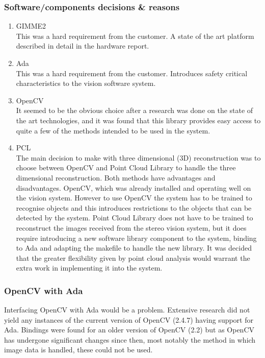 \subsubsection{Software/components decisions \& reasons}
\begin{enumerate}
  \item GIMME2 \\ This was a hard requirement from the customer. A state of the art platform described in detail in the hardware report.
  \item Ada \\ This was a hard requirement from the customer. Introduces safety critical characteristics to the vision software system.
  \item OpenCV \\ It seemed to be the obvious choice after a research was done on the state of the art technologies, and it was found that this library provides easy access to quite a few of the methods intended to be used in the system.
  \item PCL \\ The main decision to make with three dimensional (3D) reconstruction was to choose between OpenCV and Point Cloud Library to handle the three dimensional reconstruction. Both methods have advantages and disadvantages. OpenCV, which was already installed and operating well on the vision system. However to use OpenCV the system has to be trained to recognise objects and this introduces restrictions to the objects that can be detected by the system.
Point Cloud Library does not have to be trained to reconstruct the images received from the stereo vision system, but it does require introducing a new software library component to the system, binding to Ada and adapting the makefile to handle the new library.
It was decided that the greater flexibility given by point cloud analysis would warrant the extra work in implementing it into the system.
\end{enumerate}

\subsubsection{OpenCV with Ada}
Interfacing OpenCV with Ada would be a problem. Extensive research did not yield any instances of the current version of OpenCV (2.4.7) having support for Ada. Bindings were found for an older version of OpenCV (2.2) \cite{web:oldAdaBindings} but as OpenCV has undergone significant changes since then, most notably the method in which image data is handled, these could not be used.

